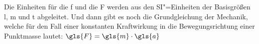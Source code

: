 \documentclass[english,ngerman]{tudscrreprt}
\begin{document}
Die Einheiten für die \gls{f} und die \gls{F} werden aus den SI"=Einheiten
der Basisgrößen \gls{l}, \gls{m} und \gls{t} abgeleitet. Und dann gibt es
noch die Grundgleichung der Mechanik, welche für den Fall einer konstanten
Kraftwirkung in die Bewegungsrichtung einer Punktmasse lautet:
$\gls{F} = \gls{m} \cdot \gls{a}$
\printsymbols[style=symbolstabu]
\clearpage
\end{document}
